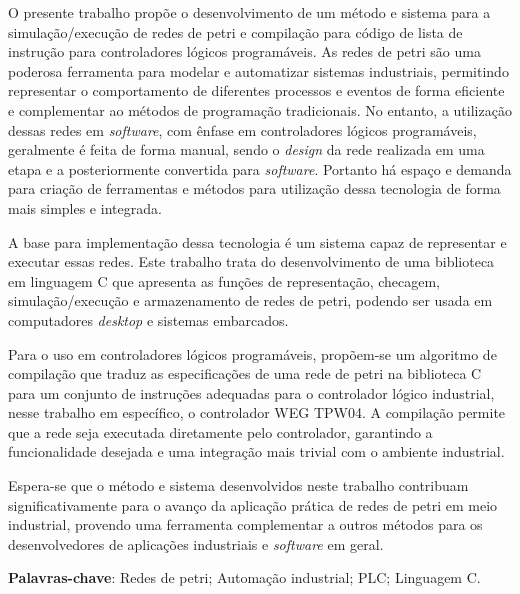 \setlength{\absparsep}{18pt} %
\begin{resumo}

O presente trabalho propõe o desenvolvimento de um método e sistema para a simulação/execução de redes de petri e compilação para código de lista de instrução para controladores lógicos programáveis. As redes de petri são uma poderosa ferramenta para modelar e automatizar sistemas industriais, permitindo representar o comportamento de diferentes processos e eventos de forma eficiente e complementar ao métodos de programação tradicionais. No entanto, a utilização dessas redes em \textit{software}, com ênfase em controladores lógicos programáveis, geralmente é feita de forma manual, sendo o \textit{design} da rede realizada em uma etapa e a posteriormente convertida para \textit{software}. Portanto há espaço e demanda para criação de ferramentas e métodos para utilização dessa tecnologia de forma mais simples e integrada.

A base para implementação dessa tecnologia é um sistema capaz de representar e executar essas redes. Este trabalho trata do desenvolvimento de uma biblioteca em linguagem C que apresenta as funções de representação, checagem, simulação/execução e armazenamento de redes de petri, podendo ser usada em computadores \textit{desktop} e sistemas embarcados. 

Para o uso em controladores lógicos programáveis, propõem-se um algoritmo de compilação que traduz as especificações de uma rede de petri na biblioteca C para um conjunto de instruções adequadas para o controlador lógico industrial, nesse trabalho em específico, o controlador WEG TPW04. A compilação permite que a rede seja executada diretamente pelo controlador, garantindo a funcionalidade desejada e uma integração mais trivial com o ambiente industrial.

Espera-se que o método e sistema desenvolvidos neste trabalho contribuam significativamente para o avanço da aplicação prática de redes de petri em meio industrial, provendo uma ferramenta complementar a outros métodos para os desenvolvedores de aplicações industriais e \textit{software} em geral.
	
\textbf{Palavras-chave}: Redes de petri; Automação industrial; PLC; Linguagem C.
\end{resumo}

